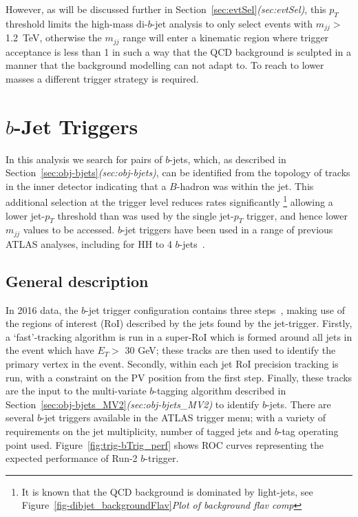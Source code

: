 However, as will be discussed further in Section~\ref{sec:evtSel}\textit{(sec:evtSel)},
this $p_T$ threshold limits the high-mass di-$b$-jet analysis to only select events with $m_{jj} >$ 1.2~TeV,
otherwise the $m_{jj}$ range will enter a kinematic region where
trigger acceptance is less than 1 in such a way that the QCD background is sculpted
in a manner that the background modelling can not adapt to.
To reach to lower masses a different trigger strategy is required.\\

\section{$b$-Jet Triggers}
\label{sec:trig-bjet}

In this analysis we search for pairs of $b$-jets,
which, as described in Section~\ref{sec:obj-bjets}\textit{(sec:obj-bjets)},
can be identified from the topology of tracks in the inner detector indicating that a $B$-hadron was within the jet.
This additional selection at the trigger level reduces rates significantly
\footnote{It is known that the QCD background is dominated by light-jets, see Figure~\ref{fig-dibjet_backgroundFlav}\textit{Plot of background flav comp}}
allowing a lower jet-$p_T$ threshold than was used by the single jet-$p_T$ trigger, and hence lower $m_{jj}$ values to be accessed.
$b$-jet triggers have been used in a range of previous ATLAS analyses,
including for HH to 4 $b$-jets~\cite{trig-H4b}.\\

\subsection{General description}

In 2016 data, the $b$-jet trigger configuration contains three steps~\cite{trig-bTrig_desc},
making use of the regions of interest (RoI) described by the jets found by the jet-trigger.
Firstly, a `fast'-tracking algorithm is run in a super-RoI
which is formed around all jets in the event which have $E_T >$ 30 GeV;
these tracks are then used to identify the primary vertex in the event.
Secondly, within each jet RoI precision tracking is run, with a constraint on the PV position from the first step.
Finally, these tracks are the input to the multi-variate $b$-tagging algorithm described in
Section~\ref{sec:obj-bjets_MV2}\textit{(sec:obj-bjets\_MV2)} to identify $b$-jets.
There are several $b$-jet triggers available in the ATLAS trigger menu;
with a variety of requirements on the jet multiplicity, number of tagged jets and $b$-tag operating point used.
Figure~\ref{fig:trig-bTrig_perf} shows ROC curves representing the expected performance of Run-2 $b$-trigger.
\\

